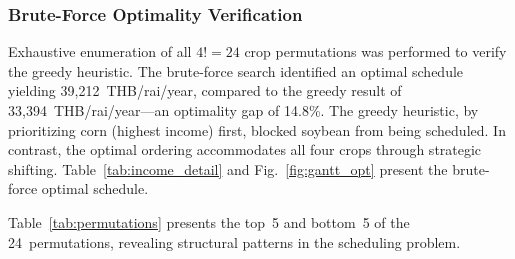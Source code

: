 \documentclass[journal]{IEEEtran}
\begin{document}
\subsubsection{Brute-Force Optimality Verification}
\label{sec:bruteforce}

Exhaustive enumeration of all $4! = 24$ crop permutations was performed to verify the greedy heuristic. The brute-force search identified an optimal schedule yielding 39,212~THB/rai/year, compared to the greedy result of 33,394~THB/rai/year---an optimality gap of 14.8\%. The greedy heuristic, by prioritizing corn (highest income) first, blocked soybean from being scheduled. In contrast, the optimal ordering accommodates all four crops through strategic shifting. Table~\ref{tab:income_detail} and Fig.~\ref{fig:gantt_opt} present the brute-force optimal schedule.

Table~\ref{tab:permutations} presents the top~5 and bottom~5 of the 24~permutations, revealing structural patterns in the scheduling problem.
\end{document}
